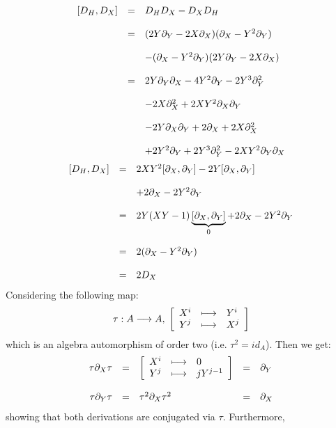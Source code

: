 $$\bao{rcl}
[D_H,D_X] &=& D_H D_X - D_X D_H\\
&&\\
&=& (2 Y \partial_Y - 2 X \partial_X)(\partial_X - Y^2 \partial_Y)\\
&&\\
&& - (\partial_X - Y^2 \partial_Y) (2 Y \partial_Y - 2 X \partial_X)\\
&&\\
&=& 2 Y \partial_Y \partial_X - 4 Y^2 \partial_Y - 2 Y^3 \partial_Y^2\\
&&\\
&& -2 X \partial_X^2 + 2 X Y^2 \partial_X \partial_Y\\
&&\\
&& - 2 Y \partial_X \partial_Y + 2 \partial_X + 2 X \partial_X^2\\
&&\\
&& + 2 Y^2 \partial_Y + 2 Y^3 \partial_Y^2 - 2 X Y^2 \partial_Y \partial_X\\ 
\ea$$
$$\bao{rcl}
[D_H,D_X] &=& 2 X Y^2 [\partial_X,\partial_Y] - 2 Y [\partial_X,\partial_Y]\\
&&\\
&& + 2 \partial_X - 2 Y^2 \partial_Y\\
&&\\
&=& 2 Y (X Y - 1) \underbrace{[\partial_X,\partial_Y]}_{0} + 2 \partial_X - 2 Y^2 \partial_Y\\
&&\\
&=& 2 (\partial_X - Y^2 \partial_Y)\\
&&\\
&=& 2 D_X\\
\ea$$
Considering the following map:
$$\tau : A \longrightarrow A,\;\left[\bao{rcl}
X^i &\longmapsto& Y^i\\
Y^j &\longmapsto& X^j\\
\ea\right]$$
which is an algebra automorphism of order two (i.e. $\tau^2 = id_A$). Then we get:
$$\bao{rclcl}
\tau \partial_X \tau &=& \left[\bao{rcl}
X^i &\longmapsto& 0\\
Y^j &\longmapsto& j Y^{j-1}\\
\ea\right] &=& \partial_Y\\
&&&&\\
\tau \partial_Y \tau &=& \tau^2 \partial_X \tau^2 &=& \partial_X\\
\ea$$
showing that both derivations are conjugated via $\tau$. Furthermore,
